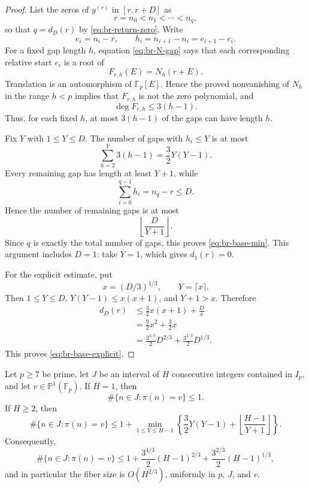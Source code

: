 \begin{proof}
List the zeros of $y^{(r)}$ in $[r,r+D]$ as
\[
 r=n_0<n_1<\cdots<n_q,
\]
so that $q=d_D(r)$ by \eqref{eq:br-return-zero}.  Write
\[
 e_i=n_i-r,
 \qquad
 h_i=n_{i+1}-n_i=e_{i+1}-e_i.
\]
For a fixed gap length $h$, equation \eqref{eq:br-N-gap} says that each
corresponding relative start $e_i$ is a root of
\[
 F_{r,h}(E)=N_h(r+E).
\]
Translation is an automorphism of $\mathbb F_p[E]$.  Hence the proved
nonvanishing of $N_h$ in the range $h<p$ implies that $F_{r,h}$ is not
the zero polynomial, and
\[
 \deg F_{r,h}\leq3(h-1).
\]
Thus, for each fixed $h$, at most $3(h-1)$ of the gaps can have length
$h$.

Fix $Y$ with $1\leq Y\leq D$.  The number of gaps with $h_i\leq Y$ is
at most
\[
 \sum_{h=2}^Y3(h-1)=\frac32Y(Y-1).
\]
Every remaining gap has length at least $Y+1$, while
\[
 \sum_{i=0}^{q-1}h_i=n_q-r\leq D.
\]
Hence the number of remaining gaps is at most
\[
 \left\lfloor\frac{D}{Y+1}\right\rfloor.
\]
Since $q$ is exactly the total number of gaps, this proves
\eqref{eq:br-base-min}.  This argument includes $D=1$: take $Y=1$,
which gives $d_1(r)=0$.

For the explicit estimate, put
\[
 x=(D/3)^{1/3},
 \qquad
 Y=\lceil x\rceil.
\]
Then $1\leq Y\leq D$, $Y(Y-1)\leq x(x+1)$, and $Y+1>x$.  Therefore
\begin{align*}
 d_D(r)
 &\leq\frac32x(x+1)+\frac{D}{x}\\
 &=\frac92x^2+\frac32x\\
 &=\frac{3^{4/3}}2D^{2/3}
   +\frac{3^{2/3}}2D^{1/3}.
\end{align*}
This proves \eqref{eq:br-base-explicit}.
\end{proof}

\begin{proposition}
\label{thm:br-projective-fiber}
Let $p\geq7$ be prime, let $J$ be an interval of $H$ consecutive
integers contained in $I_p$, and let $v\in\mathbb P^1(\mathbb F_p)$.
If $H=1$, then
\[
 \#\{n\in J:\pi(n)=v\}\leq1.
\]
If $H\geq2$, then
\begin{equation}
 \#\{n\in J:\pi(n)=v\}
 \leq
 1+
 \min_{1\leq Y\leq H-1}
 \left\{
   \frac32Y(Y-1)
   +\left\lfloor\frac{H-1}{Y+1}\right\rfloor
 \right\}.
 \label{eq:br-fiber-min}
\end{equation}
Consequently,
\begin{equation}
 \#\{n\in J:\pi(n)=v\}
 \leq
 1+\frac{3^{4/3}}2(H-1)^{2/3}
  +\frac{3^{2/3}}2(H-1)^{1/3},
 \label{eq:br-fiber-explicit}
\end{equation}
and in particular the fiber size is $O(H^{2/3})$, uniformly in
$p$, $J$, and $v$.
\end{proposition}

